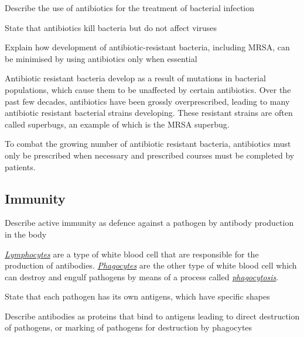 \begin{point}
Describe the use of antibiotics for the treatment of bacterial infection
\end{point}

\begin{point}
State that antibiotics kill bacteria but do not affect viruses
\end{point}

\begin{point}
Explain how development of antibiotic-resistant bacteria, including MRSA, can be minimised by using 
antibiotics only when essential
\end{point}

Antibiotic resistant bacteria develop as a result of mutations in bacterial populations, which
cause them to be unaffected by certain antibiotics. Over the past few decades, antibiotics have
been grossly overprescribed, leading to many antibiotic resistant bacterial strains developing.
These resistant strains are often called superbugs, an example of which is the MRSA superbug.

To combat the growing number of antibiotic resistant bacteria, antibiotics must only be prescribed
when necessary and prescribed courses must be completed by patients.

\subsection{Immunity}

\begin{point}
Describe active immunity as defence against a pathogen by antibody production in the body
\end{point}

\ul{\emph{Lymphocytes}} are a type of white blood cell that are responsible for the 
production of antibodies. \ul{\emph{Phagocytes}} are the other type of white blood cell
which can destroy and engulf pathogens by means of a process called 
\ul{\emph{phagocytosis}}.

\begin{point}
State that each pathogen has its own antigens, which have specific shapes
\end{point}

\begin{point}
Describe antibodies as proteins that bind to antigens leading to direct destruction of pathogens, or 
marking of pathogens for destruction by phagocytes
\end{point}

